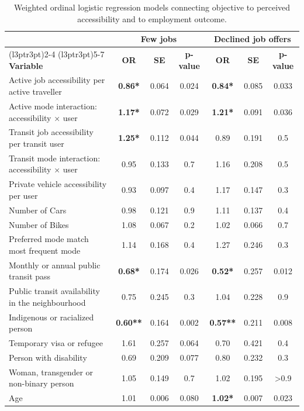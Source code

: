 \documentclass[preprint, 3p,
authoryear]{elsarticle} %
\begin{document}
\begin{table}

\caption{\label{tab:unnamed-chunk-2}\label{tab:models}Weighted ordinal logistic regression models connecting objective to perceived accessibility and to employment outcome.}
\centering
\begin{tabular}[t]{lcccccc}
\toprule
\multicolumn{1}{c}{ } & \multicolumn{3}{c}{\textbf{Few jobs}} & \multicolumn{3}{c}{\textbf{Declined job offers}} \\
\cmidrule(l{3pt}r{3pt}){2-4} \cmidrule(l{3pt}r{3pt}){5-7}
\textbf{Variable} & \textbf{OR} & \textbf{SE} & \textbf{p-value} & \textbf{OR} & \textbf{SE} & \textbf{p-value}\\
\midrule
Active job accessibility per active traveller & \textbf{0.86*} & 0.064 & 0.024 & \textbf{0.84*} & 0.085 & 0.033\\
Active mode interaction: accessibility × user & \textbf{1.17*} & 0.072 & 0.029 & \textbf{1.21*} & 0.091 & 0.036\\
Transit job accessibility per transit user & \textbf{1.25*} & 0.112 & 0.044 & 0.89 & 0.191 & 0.5\\
Transit mode interaction: accessibility × user & 0.95 & 0.133 & 0.7 & 1.16 & 0.208 & 0.5\\
Private vehicle accessibility per user & 0.93 & 0.097 & 0.4 & 1.17 & 0.147 & 0.3\\
\addlinespace
Number of Cars & 0.98 & 0.121 & 0.9 & 1.11 & 0.137 & 0.4\\
Number of Bikes & 1.08 & 0.067 & 0.2 & 1.02 & 0.066 & 0.7\\
Preferred mode match most frequent mode & 1.14 & 0.168 & 0.4 & 1.27 & 0.246 & 0.3\\
Monthly or annual public transit pass & \textbf{0.68*} & 0.174 & 0.026 & \textbf{0.52*} & 0.257 & 0.012\\
Public transit availability in the neighbourhood & 0.75 & 0.245 & 0.3 & 1.04 & 0.228 & 0.9\\
\addlinespace
Indigenous or racialized person & \textbf{0.60**} & 0.164 & 0.002 & \textbf{0.57**} & 0.211 & 0.008\\
Temporary visa or refugee & 1.61 & 0.257 & 0.064 & 0.70 & 0.421 & 0.4\\
Person with disability & 0.69 & 0.209 & 0.077 & 0.80 & 0.232 & 0.3\\
Woman, transgender or non-binary person & 1.05 & 0.149 & 0.7 & 1.02 & 0.195 & >0.9\\
Age & 1.01 & 0.006 & 0.080 & \textbf{1.02*} & 0.007 & 0.023\\

\end{tabular}
\end{table}
\end{document}

